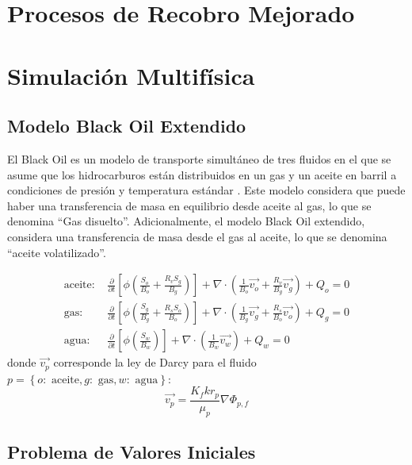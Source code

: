\section{Procesos de Recobro Mejorado}

\section{Simulación Multifísica}
\subsection{Modelo Black Oil Extendido}

El Black Oil es un modelo de transporte simultáneo de tres fluidos en el que se asume que los hidrocarburos están distribuidos en un gas y un aceite en barril a condiciones de presión y temperatura estándar \citep{chen2007reservoir}. Este modelo considera que puede haber una transferencia de masa en equilibrio desde aceite al gas, lo que se denomina ``Gas disuelto''. Adicionalmente, el modelo Black Oil extendido, considera una transferencia de masa desde el gas al aceite, lo que se denomina ``aceite volatilizado''.

\begin{align}
\label{ec:aceite}
\text{aceite: }&\frac{\partial}{\partial t} \left[ \phi \left( \frac{S_{o}}{B_{o}} + \frac{R_{v} S_{g}}{B_{g}} \right) \right]
+ \nabla \cdot \left( \frac{1}{B_{o}} \vec{v_{o}} + \frac{R_{v}}{B_{g}} \vec{v_{g}} \right) + Q_{o} = 0 \\
\label{ec:gas}
\text{gas: }&\frac{\partial}{\partial t} \left[ \phi \left( \frac{S_{g}}{B_{g}} + \frac{R_{s} S_{o}}{B_{o}} \right) \right]
+ \nabla \cdot \left( \frac{1}{B_{g}} \vec{v_{g}} + \frac{R_{s}}{B_{o}} \vec{v_{o}} \right) + Q_{g} = 0\\
\label{ec:agua}
\text{agua: }&\frac{\partial}{\partial t} \left[\phi \left( \frac{S_{w}}{B_{w}} \right) \right] + \nabla \cdot \left( \frac{1}{B_{w}} \vec{v_{w}} \right) + Q_{w} = 0
\end{align}
donde $\vec{v_{p}}$ corresponde la ley de Darcy para el fluido $p = \left\lbrace o:\text{ aceite}, g:\text{ gas}, w:\text{ agua} \right\rbrace $:
\begin{equation}
\vec{v_{p}}=\frac{K_{f}kr_{p}}{\mu_{p} } \nabla{\Phi_{p,f}}
\end{equation}
\subsection{Problema de Valores Iniciales}
%
